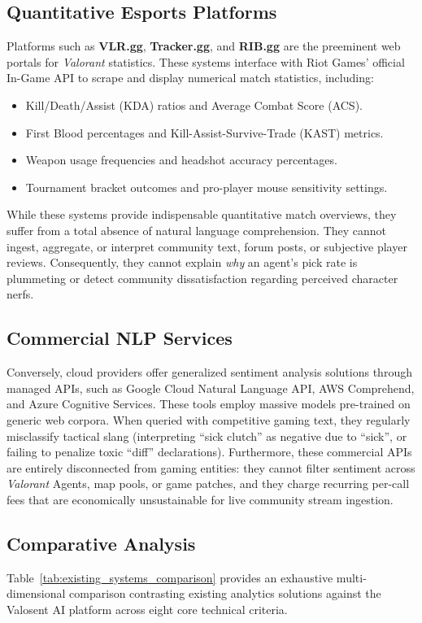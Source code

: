 \subsection{Quantitative Esports Platforms}
Platforms such as \textbf{VLR.gg}, \textbf{Tracker.gg}, and \textbf{RIB.gg} are the preeminent web portals for \textit{Valorant} statistics. These systems interface with Riot Games' official In-Game API to scrape and display numerical match statistics, including:
\begin{itemize}
    \item Kill/Death/Assist (KDA) ratios and Average Combat Score (ACS).
    \item First Blood percentages and Kill-Assist-Survive-Trade (KAST) metrics.
    \item Weapon usage frequencies and headshot accuracy percentages.
    \item Tournament bracket outcomes and pro-player mouse sensitivity settings.
\end{itemize}
While these systems provide indispensable quantitative match overviews, they suffer from a total absence of natural language comprehension. They cannot ingest, aggregate, or interpret community text, forum posts, or subjective player reviews. Consequently, they cannot explain \textit{why} an agent's pick rate is plummeting or detect community dissatisfaction regarding perceived character nerfs.

\subsection{Commercial NLP Services}
Conversely, cloud providers offer generalized sentiment analysis solutions through managed APIs, such as Google Cloud Natural Language API, AWS Comprehend, and Azure Cognitive Services. These tools employ massive models pre-trained on generic web corpora. When queried with competitive gaming text, they regularly misclassify tactical slang (interpreting ``sick clutch'' as negative due to ``sick'', or failing to penalize toxic ``diff'' declarations). Furthermore, these commercial APIs are entirely disconnected from gaming entities: they cannot filter sentiment across \textit{Valorant} Agents, map pools, or game patches, and they charge recurring per-call fees that are economically unsustainable for live community stream ingestion.

\subsection{Comparative Analysis}
Table~\ref{tab:existing_systems_comparison} provides an exhaustive multi-dimensional comparison contrasting existing analytics solutions against the Valosent AI platform across eight core technical criteria.

